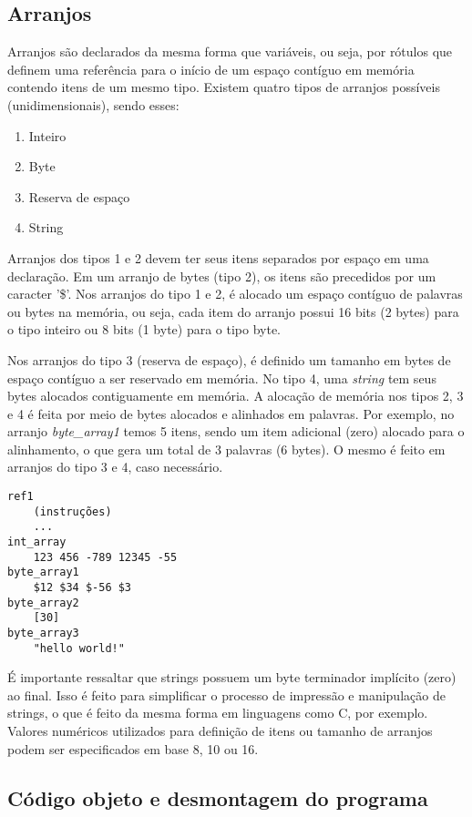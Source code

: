 \documentclass[11pt,a4paper]{report}
\begin{document}
\subsection{Arranjos}

Arranjos são declarados da mesma forma que variáveis, ou seja, por
rótulos que definem uma referência para o início de um espaço contíguo
em memória contendo itens de um mesmo tipo. Existem quatro tipos de
arranjos possíveis (unidimensionais), sendo esses:

\begin{enumerate}
\item Inteiro
\item Byte
\item Reserva de espaço
\item String
\end{enumerate}

Arranjos dos tipos 1 e 2 devem ter seus itens separados por espaço em
uma declaração. Em um arranjo de bytes (tipo 2), os itens são precedidos
por um caracter '\$'. Nos arranjos do tipo 1 e 2, é alocado um espaço 
contíguo de palavras ou bytes na memória, ou seja, cada item do arranjo
possui 16 bits (2 bytes) para o tipo inteiro ou 8 bits (1 byte) para o
tipo byte.

Nos arranjos do tipo 3 (reserva de espaço), é definido um tamanho em
bytes de espaço contíguo a ser reservado em memória. No tipo 4, uma
\textit{string} tem seus bytes alocados contiguamente em memória. A
alocação de memória nos tipos 2, 3 e 4 é feita por meio de bytes alocados
e alinhados em palavras. Por exemplo, no arranjo \textit{byte\_array1}
temos 5 itens, sendo um item adicional (zero) alocado para o alinhamento,
o que gera um total de 3 palavras (6 bytes). O mesmo é feito em arranjos
do tipo 3 e 4, caso necessário.

\begin{verbatim}
ref1
    (instruções)
    ...
int_array
    123 456 -789 12345 -55
byte_array1
    $12 $34 $-56 $3
byte_array2
    [30]
byte_array3
    "hello world!"
\end{verbatim}

É importante ressaltar que strings possuem um byte terminador implícito
(zero) ao final. Isso é feito para simplificar o processo de impressão e
manipulação de strings, o que é feito da mesma forma em linguagens como
C, por exemplo. Valores numéricos utilizados para definição de itens
ou tamanho de arranjos podem ser especificados em base 8, 10 ou 16.

\subsection{Código objeto e desmontagem do programa}
\end{document}
